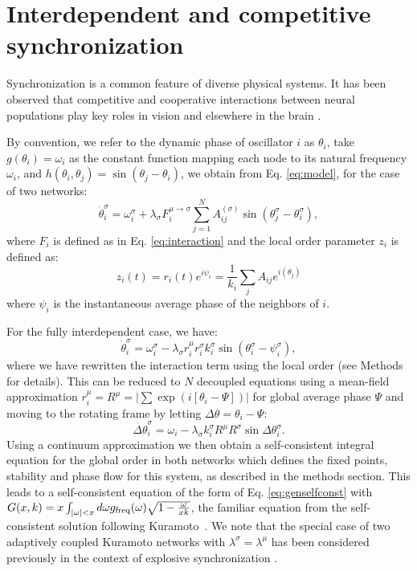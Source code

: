 \documentclass[pre,twocolumn,superscriptaddress]{revtex4}
\newcommand{\1}{\mathds{1}}
\begin{document}
{\section{Interdependent and competitive synchronization}
Synchronization is a common feature of diverse physical systems.  
It has been observed that competitive and cooperative interactions between neural populations play key roles in vision \cite{fries-pnas1997} and elsewhere in the brain \cite{fox-pnas2005}.

By convention, we refer to the dynamic phase of oscillator $i$ as $\theta_i$, take $g(\theta_i) = \omega_i$ as the constant function mapping each node to its natural frequency $\omega_i$, and $h(\theta_i,\theta_j) = \sin(\theta_j - \theta_i)$, we obtain from Eq. \eqref{eq:model}, for the case of two networks:
\begin{equation}
\dot{\theta}_i^\sigma=\omega_i^\sigma+\lambda_\sigma F_i^{\mu\to\sigma}\sum_{j=1}^N A_{ij}^{(\sigma)}\sin(\theta_j^\sigma-\theta_i^\sigma),\label{eq:multiKura}
\end{equation}
where $F_i$ is defined as in Eq. \eqref{eq:interaction} and the local order parameter $z_i$ is defined as:
\begin{equation}\label{eq:localOP}
z_i(t) = r_i(t) e^{i\psi_i} =  \frac{1}{k_i} \sum_j A_{ij} e^{i(\theta_j)}
\end{equation}
where $\psi_i$ is the instantaneous average phase of the neighbors of $i$.  

For the fully interdependent case, we have: 
\begin{equation}
\dot{\theta}_i^\sigma=\omega_i^\sigma-\lambda_\sigma r_i^\mu r_i^\sigma k_i^\sigma \sin(\theta_i^\sigma-\psi_i^\sigma),\label{eq:interKura}
\end{equation}
where we have rewritten the interaction term using the local order (see Methods for details). This can be reduced to $N$ decoupled equations using a mean-field approximation $r_i^\mu=R^\mu = \lvert \sum\exp(i [\theta_i - \Psi]) \rvert$ for global average phase $\Psi$ and moving to the rotating frame by letting $\Delta\theta = \theta_i - \Psi$:
\begin{equation}\label{eq:interKura2}
\dot{\Delta\theta}_i^\sigma=\omega_i-\lambda_\sigma k_i^{\sigma}R^{\mu}R^{\sigma}\sin\Delta\theta_i^\sigma.
\end{equation}
Using a continuum approximation we then obtain a self-consistent integral equation for the global order in both networks which defines the fixed points, stability and phase flow for this system, as described in the methods section.
This leads to a self-consistent equation of the form of Eq. \eqref{eq:genselfconst} with $G(x,k) = x \int_{|\omega|<x} d\omega g_{\rm freq}(\omega) \sqrt{1 - \frac{\omega}{xk}} $, the familiar equation from the self-consistent solution following Kuramoto~\cite{kuramoto-proceedings1975}.
We note that the special case of two adaptively coupled Kuramoto networks with $\lambda^\sigma = \lambda^\mu$ has been considered previously in the context of explosive synchronization \cite{filatrella-pre2007,zhang-prl2015,danziger-chaos2016}.

}
\end{document}
